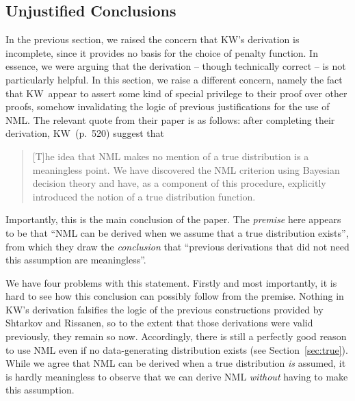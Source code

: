 \documentclass[authoryear]{elsarticle}
\newcommand{\kw}{KW}
\begin{document}
\subsection{Unjustified Conclusions}

\label{sec:nonseq}
In the previous section, we raised the concern that \kw's derivation is
incomplete, since it provides no basis for the choice of penalty function.
In essence, we were arguing that the derivation -- though technically
correct -- is not particularly helpful. In this section, we raise a different
concern, namely the fact that \kw\ appear to assert some kind of special
privilege to their proof over other proofs, somehow invalidating the
logic of previous justifications for the use of NML. The relevant quote
from their paper is as follows:  after completing their derivation,
\kw\  (p.\ 520) suggest that
\begin{quote} [T]he idea that NML makes no mention of a true
  distribution is a meaningless point. We have discovered the NML
  criterion using Bayesian decision theory and have, as a component of
  this procedure, explicitly introduced the notion of a true
  distribution function.
\end{quote}
Importantly, this is the main conclusion of the paper. The
{\em premise\/} here appears to be that ``NML can be derived when
we assume that a true distribution exists'', from which they draw the
{\em conclusion} that ``previous derivations that did not need this
assumption are meaningless''.

We have four problems with this statement. Firstly and most
importantly, it is hard to
see how this conclusion can possibly follow from the premise.
Nothing in \kw's derivation falsifies the logic of the previous
constructions provided by Shtarkov and Rissanen, so to the extent
that those derivations were valid previously, they remain so now.
Accordingly, there is still a perfectly good reason to use NML even if
no data-generating distribution exists (see Section~\ref{sec:true}).
While
 we agree that NML can be derived when a true distribution {\it is}
 assumed, it is hardly meaningless to observe that we can derive NML
 {\it without} having to make this assumption.
\end{document}

